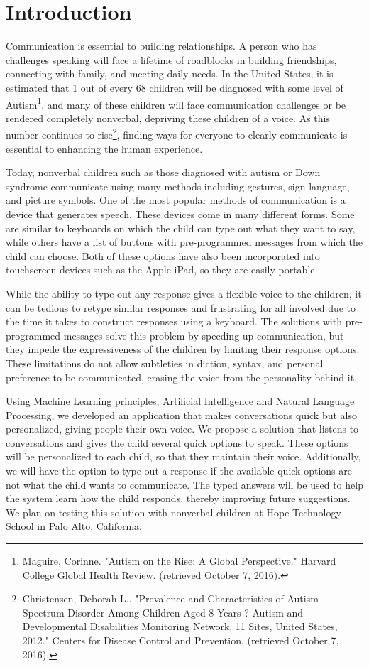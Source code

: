 \chapter{Introduction}

Communication is essential to building relationships. A person who has challenges speaking will face a lifetime of roadblocks in building friendships, connecting with family, and meeting daily needs. In the United States, it is estimated that 1 out of every 68 children will be diagnosed with some level of Autism\footnote[1]{Maguire, Corinne. "Autism on the Rise: A Global Perspective." Harvard College Global Health Review. (retrieved October 7, 2016).}, and many of these children will face communication challenges or be rendered completely nonverbal, depriving these children of a voice. As this number continues to rise\footnote[2]{Christensen, Deborah L.. "Prevalence and Characteristics of Autism Spectrum Disorder Among Children Aged 8 Years ? Autism and Developmental Disabilities Monitoring Network, 11 Sites, United States, 2012." Centers for Disease Control and Prevention. (retrieved October 7, 2016).}, finding ways for everyone to clearly communicate is essential to enhancing the human experience.

Today, nonverbal children such as those diagnosed with autism or Down syndrome communicate using many methods including gestures, sign language, and picture symbols. One of the most popular methods of communication is a device that generates speech. These devices come in many different forms. Some are similar to keyboards on which the child can type out what they want to say, while others have a list of buttons with pre-programmed messages from which the child can choose. Both of these options have also been incorporated into touchscreen devices such as the Apple iPad, so they are easily portable. 

While the ability to type out any response gives a flexible voice to the children, it can be tedious to retype similar responses and frustrating for all involved due to the time it takes to construct responses using a keyboard. The solutions with pre-programmed messages solve this problem by speeding up communication, but they impede the expressiveness of the children by limiting their response options. These limitations do not allow subtleties in diction, syntax, and personal preference to be communicated, erasing the voice from the personality behind it.

Using Machine Learning principles, Artificial Intelligence and Natural Language Processing, we developed an application that makes conversations quick but also personalized, giving people their own voice. We propose a solution that listens to conversations and gives the child several quick options to speak. These options will be personalized to each child, so that they maintain their voice. Additionally, we will have the option to type out a response if the available quick options are not what the child wants to communicate. The typed answers will be used to help the system learn how the child responds, thereby improving future suggestions. We plan on testing this solution with nonverbal children at Hope Technology School in Palo Alto, California.

